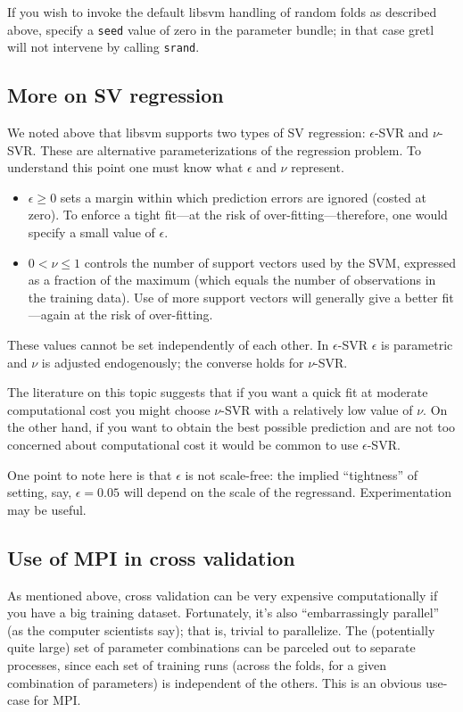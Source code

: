 \documentclass{article}
\begin{document}
If you wish to invoke the default \textsf{libsvm} handling of random
folds as described above, specify a \texttt{seed} value of zero in the
parameter bundle; in that case gretl will not intervene by calling
\texttt{srand}.

\subsection{More on SV regression}
\label{sec:svr}

We noted above that libsvm supports two types of SV regression:
$\epsilon$-SVR and $\nu$-SVR. These are alternative parameterizations
of the regression problem. To understand this point one must know what
$\epsilon$ and $\nu$ represent.
\begin{itemize}
\item $\epsilon \geq 0$ sets a margin within which prediction errors
  are ignored (costed at zero). To enforce a tight fit---at the risk
  of over-fitting---therefore, one would specify a small value of
  $\epsilon$.
\item $0 < \nu \leq 1$ controls the number of support vectors used by
  the SVM, expressed as a fraction of the maximum (which equals the
  number of observations in the training data). Use of more support
  vectors will generally give a better fit---again at the risk of
  over-fitting.
\end{itemize}
These values cannot be set independently of each other. In
$\epsilon$-SVR $\epsilon$ is parametric and $\nu$ is adjusted
endogenously; the converse holds for $\nu$-SVR.

The literature on this topic suggests that if you want a quick fit at
moderate computational cost you might choose $\nu$-SVR with a
relatively low value of $\nu$. On the other hand, if you want to
obtain the best possible prediction and are not too concerned about
computational cost it would be common to use $\epsilon$-SVR.

One point to note here is that $\epsilon$ is not scale-free: the
implied ``tightness'' of setting, say, $\epsilon = 0.05$ will depend
on the scale of the regressand. Experimentation may be useful.

\subsection{Use of MPI in cross validation}
\label{sec:mpi}

As mentioned above, cross validation can be very expensive
computationally if you have a big training dataset. Fortunately, it's
also ``embarrassingly parallel'' (as the computer scientists say);
that is, trivial to parallelize. The (potentially quite large) set of
parameter combinations can be parceled out to separate processes,
since each set of training runs (across the folds, for a given
combination of parameters) is independent of the others. This is an
obvious use-case for MPI.
\end{document}
